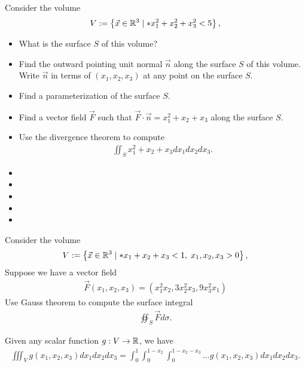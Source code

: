 \documentclass[11pt]{article}
\begin{document}




\begin{exercise}
    Consider the volume 
    \begin{align}
     V := \left\{ \vec x \in \bbR^3 \suchthat* x_1^2 + x_2^2 + x_3^2 < 5 \right\},
    \end{align}
    \begin{itemize}
     \item
     What is the surface $S$ of this volume?
     \item 
     Find the outward pointing unit normal $\vec n$ along the surface $S$ of this volume. Write $\vec n$ in terms of $(x_1,x_2,x_3)$ at any point on the surface $S$. 
     \item
     Find a parameterization of the surface $S$.
     \item
     Find a vector field $\vec F$ such that $\vec F \cdot \vec n = x_1^2 + x_2 + x_3$ along the surface $S$.
     \item 
     Use the divergence theorem to compute 
     \begin{align}
        \iint_{S} x_1^2 + x_2 + x_3 dx_1 dx_2 dx_3.
     \end{align}
    \end{itemize}
\end{exercise}
\begin{solution}     
    \begin{itemize}
     \item
     \item 
     \item
     \item
     \item 
    \end{itemize}
\end{solution}


\begin{exercise}
    Consider the volume 
    \begin{align}
     V := \left\{ \vec x \in \bbR^3 \suchthat* x_1 + x_2 + x_3 < 1, \; x_1, x_2, x_3 > 0 \right\},
    \end{align}
    Suppose we have a vector field 
    \begin{align}
        \vec F(x_1,x_2,x_3) = \left( x_1^2 x_2, 3 x_2^{2} x_3, 9 x_3^{2} x_1 \right)
    \end{align}
    Use Gauss theorem to compute the surface integral 
    \begin{align}
        \oiint_{S} \vec F d\sigma.
    \end{align}
\end{exercise}
\begin{solution}     
    Given any scalar function $g : V \to \mathbb{R}$, we have 
    \begin{align}
     \iiint_V g(x_1,x_2,x_3) dx_1dx_2dx_3
     =
     \int_{0}^{1}
     \int_{0}^{1 - x_2}
     \int_{0}^{1 - x_2 - x_3}
     ...
     g(x_1,x_2,x_3) dx_1dx_2dx_3
     .
    \end{align}
\end{solution}
\end{document}
